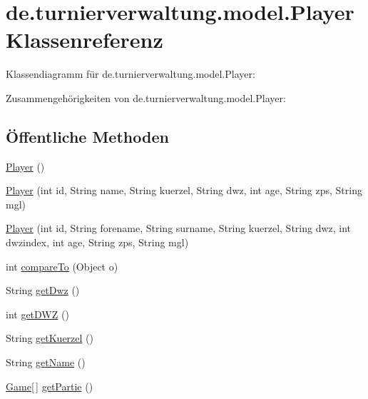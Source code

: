 \hypertarget{classde_1_1turnierverwaltung_1_1model_1_1_player}{}\section{de.\+turnierverwaltung.\+model.\+Player Klassenreferenz}
\label{classde_1_1turnierverwaltung_1_1model_1_1_player}


Klassendiagramm für de.\+turnierverwaltung.\+model.\+Player\+:


Zusammengehörigkeiten von de.\+turnierverwaltung.\+model.\+Player\+:
\subsection*{Öffentliche Methoden}
\begin{DoxyCompactItemize}
\item 
\hyperlink{classde_1_1turnierverwaltung_1_1model_1_1_player_a661a77ca86e56406c2c7eb5b15101060}{Player} ()
\item 
\hyperlink{classde_1_1turnierverwaltung_1_1model_1_1_player_a5f1352bf51c070eafd6d3c0dec4c0d2a}{Player} (int id, String name, String kuerzel, String dwz, int age, String zps, String mgl)
\item 
\hyperlink{classde_1_1turnierverwaltung_1_1model_1_1_player_ac426b1f9b2d5bd0756d2c6a098a78603}{Player} (int id, String forename, String surname, String kuerzel, String dwz, int dwzindex, int age, String zps, String mgl)
\item 
int \hyperlink{classde_1_1turnierverwaltung_1_1model_1_1_player_aca167b6a1995aa48d36f327837e2d607}{compare\+To} (Object o)
\item 
String \hyperlink{classde_1_1turnierverwaltung_1_1model_1_1_player_aa4518a1d5b04ed894895117bd4281627}{get\+Dwz} ()
\item 
int \hyperlink{classde_1_1turnierverwaltung_1_1model_1_1_player_abbaa00d1431c75944926b891a11c184b}{get\+D\+WZ} ()
\item 
String \hyperlink{classde_1_1turnierverwaltung_1_1model_1_1_player_a9e0f7ba95bd03108e6d2acb86ab269cb}{get\+Kuerzel} ()
\item 
String \hyperlink{classde_1_1turnierverwaltung_1_1model_1_1_player_ac5597264b5461989822edebff06fb63c}{get\+Name} ()
\item 
\hyperlink{classde_1_1turnierverwaltung_1_1model_1_1_game}{Game}\mbox{[}$\,$\mbox{]} \hyperlink{classde_1_1turnierverwaltung_1_1model_1_1_player_ab6f96b68c41d353d90abef58a8eb87a6}{get\+Partie} ()

\end{DoxyCompactItemize}

